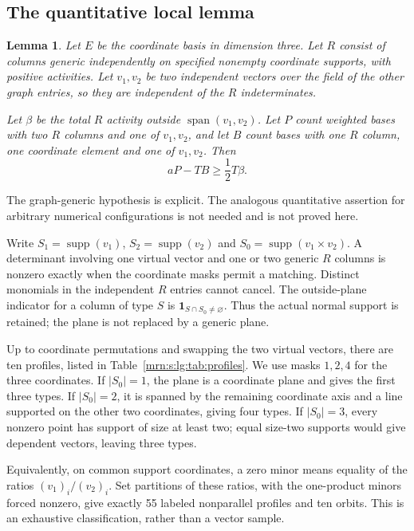 \documentclass[11pt,a4paper]{article}
\newtheorem{lemma}[theorem]{Lemma}
\theoremstyle{remark}\newtheorem{remark}[theorem]{Remark}
\newcommand{\spn}{\operatorname{span}}     %
\begin{document}
\subsection{The quantitative local lemma}
\begin{lemma}\label{mrn:s:lg:lem:local}
Let $E$ be the coordinate basis in dimension three. Let $R$ consist of columns generic independently on specified nonempty coordinate supports, with positive activities. Let $v_1,v_2$ be two independent vectors over the field of the other graph entries, so they are independent of the $R$ indeterminates.

Let $\beta$ be the total $R$ activity outside $\spn(v_1,v_2)$. Let $P$ count weighted bases with two $R$ columns and one of $v_1,v_2$, and let $B$ count bases with one $R$ column, one coordinate element and one of $v_1,v_2$. Then
\begin{equation}\label{mrn:s:lg:eq:local}
 aP-TB\ge\frac12T\beta.
\end{equation}
\end{lemma}
The graph-generic hypothesis is explicit. The analogous quantitative assertion for arbitrary numerical configurations is not needed and is not proved here.

Write $S_1=\operatorname{supp}(v_1)$, $S_2=\operatorname{supp}(v_2)$ and
$S_0=\operatorname{supp}(v_1\times v_2)$.
A determinant involving one virtual vector and one or two generic $R$ columns is nonzero exactly when the coordinate masks permit a matching. Distinct monomials in the independent $R$ entries cannot cancel. The outside-plane indicator for a column of type $S$ is $\mathbf1_{S\cap S_0\ne\varnothing}$.
Thus the actual normal support is retained; the plane is not replaced by a generic plane.

Up to coordinate permutations and swapping the two virtual vectors, there are ten profiles, listed in Table~\ref{mrn:s:lg:tab:profiles}. We use masks $1,2,4$ for the three coordinates. If $|S_0|=1$, the plane is a coordinate plane and gives the first three types. If $|S_0|=2$, it is spanned by the remaining coordinate axis and a line supported on the other two coordinates, giving four types. If $|S_0|=3$, every nonzero point has support of size at least two; equal size-two supports would give dependent vectors, leaving three types.

Equivalently, on common support coordinates, a zero minor means equality of the ratios $(v_1)_i/(v_2)_i$. Set partitions of these ratios, with the one-product minors forced nonzero, give exactly 55 labeled nonparallel profiles and ten orbits. This is an exhaustive classification, rather than a vector sample.
\end{document}
